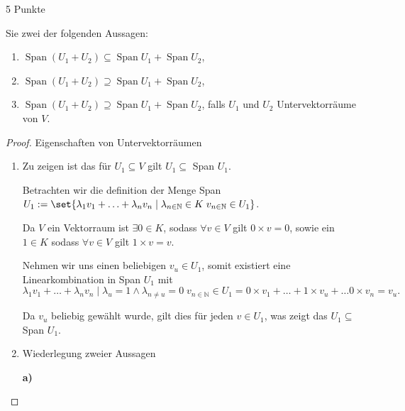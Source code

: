 \documentclass{problemset}
\begin{document}
\begin{problem}{5 Punkte}
\begin{enumerate}
          Sie zwei der folgenden Aussagen:
          \begin{enumerate}[label=\alph*)]
              \item $\operatorname{Span}(U_1 + U_2) \subseteq \operatorname{Span} U_1 + \operatorname{Span} U_2$,
              \item $\operatorname{Span}(U_1 + U_2) \supseteq \operatorname{Span} U_1 + \operatorname{Span} U_2$,
              \item $\operatorname{Span}(U_1 + U_2) \supseteq \operatorname{Span} U_1 + \operatorname{Span} U_2$, falls $U_1$ und $U_2$ Untervektorräume von $V$.
          \end{enumerate}
\end{enumerate}
\begin{proof}
    Eigenschaften von Untervektorräumen
    \begin{enumerate}
        \item Zu zeigen ist das für $U_1 \subseteq V$ gilt $U_1 \subseteq$ Span $U_1$.

              Betrachten wir die definition der Menge Span $U_1 := \set{\lambda_1 v_1 +
                      \ldots + \lambda_n v_n \mid \lambda_{n \in \mathbb{N}} \in K \; v_{n \in
                              \mathbb{N}} \in U_1}$.

              Da $V$ ein Vektorraum ist $\exists 0 \in K$, sodass $\forall v \in V$ gilt $0
                  \times v = 0$, sowie ein $1 \in K$ sodass $\forall v \in V$ gilt $1 \times v =
                  v$.

              Nehmen wir uns einen beliebigen $v_u \in U_1$, somit existiert eine
              Linearkombination in Span $U_1$ mit \[
                  \lambda_1 v_1 + \ldots + \lambda_n v_n \mid \lambda_u = 1 \land \lambda_{n \ne u} = 0 \; v_{n \in \mathbb{N}} \in U_1 = 0 \times v_1 + \ldots + 1 \times v_u + \ldots 0 \times v_n = v_u.
              \]

              Da \(v_u\) beliebig gewählt wurde, gilt dies für jeden \(v \in U_1\), was zeigt
              das $U_1 \subseteq$ Span $U_1$. \checkmark
        \item Wiederlegung zweier Aussagen

              \textbf{a)}


\end{enumerate}
\end{proof}
\end{problem}
\end{document}

